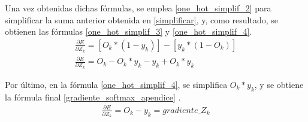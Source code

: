 Una vez obtenidas dichas fórmulas, se emplea \ref{one_hot_simplif_2} para simplificar la suma anterior obtenida en \ref{simplificar}, y, como resultado, se obtienen las fórmulas \ref{one_hot_simplif_3} y \ref{one_hot_simplif_4}. \\


\begin{gather}
	\frac{\partial E}{\partial Z_k} = [O_k*(1-y_k)] - [y_k*(1-O_k)] \label{one_hot_simplif_3} \\
	\frac{\partial E}{\partial Z_k} = O_k - O_k * y_k - y_k + O_k * y_k  \label{one_hot_simplif_4}
\end{gather}

Por último, en la fórmula \ref{one_hot_simplif_4}, se simplifica $O_k*y_k$, y se obtiene la fórmula final \ref{gradiente_softmax_apendice} \cite{Cross_entropy_backprop} \cite{Cross_entropy_backprop_grad_input}. \\
\begin{gather}
	\frac{\partial E}{\partial Z_k} = O_k - y_k = gradiente\_Z_k
	\label{gradiente_softmax_apendice}
\end{gather} 
